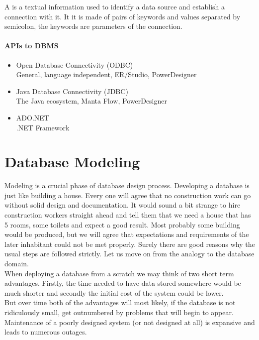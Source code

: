 A  is a textual information used to identify a data source and establish a connection with it. It it is made of pairs of keywords and values separated by semicolon, the keywords are parameters of the connection.

\paragraph{APIs to DBMS}
\begin{itemize}
	\item Open Database Connectivity (ODBC)\\
		General, language independent, ER/Studio, PowerDesigner
	\item Java Database Connectivity (JDBC)\\
		The Java ecosystem, Manta Flow, PowerDesigner
	\item ADO.NET\\
		.NET Framework
\end{itemize}

\section{Database Modeling}
\label{chap:database_modeling}

Modeling is a crucial phase of database design process.
Developing a database is just like building a house. 
Every one will agree that no construction work can go without solid design and documentation. 
It would sound a bit strange to hire construction workers straight ahead and tell them that we need a house that has 5 rooms, some toilets and expect a good result. Most probably some building would be produced, but we will agree that expectations and requirements of the later inhabitant could not be met properly.
Surely there are good reasons why the usual steps are followed strictly.
Let us move on from the analogy to the database domain. \\
When deploying a database from a scratch we may think of two short term advantages. Firstly, the time needed to have data stored somewhere would be much shorter and secondly the initial cost of the system could be lower. \\
But over time both of the advantages will most likely, if the database is not ridiculously small, get outnumbered by problems that will begin to appear. Maintenance of a poorly designed system (or not designed at all) is expansive and leads to numerous outages.\\

